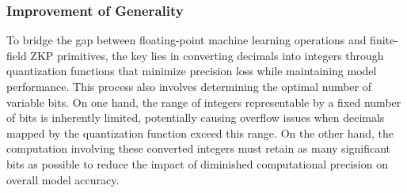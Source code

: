 \documentclass[journal]{IEEEtran}
\begin{document}
\subsubsection{Improvement of Generality}\label{sss:3a}
To bridge the gap between floating-point machine learning operations and finite-field ZKP primitives, the key lies in converting decimals into integers through quantization functions that minimize precision loss while maintaining model performance. This process also involves determining the optimal number of variable bits. On one hand, the range of integers representable by a fixed number of bits is inherently limited, potentially causing overflow issues when decimals mapped by the quantization function exceed this range. On the other hand, the computation involving these converted integers must retain as many significant bits as possible to reduce the impact of diminished computational precision on overall model accuracy.
\end{document}
